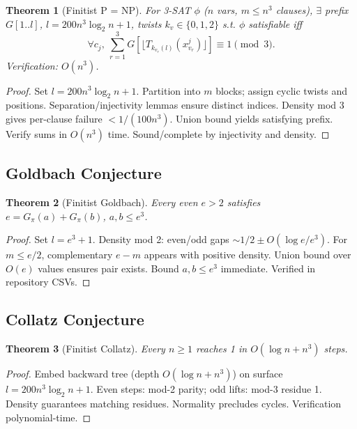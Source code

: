 \documentclass[11pt]{article}
\newtheorem{theorem}{Theorem}[section]
\begin{document}
\begin{theorem}[Finitist P = NP]
For 3-SAT $\phi$ ($n$ vars, $m\le n^3$ clauses), $\exists$ prefix $G[1..l]$, $l=200 n^3 \log_2 n + 1$, twists $k_v\in\{0,1,2\}$ s.t. $\phi$ satisfiable iff
\[
\forall c_j,\ \sum_{r=1}^3 G[\lfloor T_{k_{v_r}(l)}(x_{v_r}^j) \rfloor] \equiv 1 \pmod{3}.
\]
Verification: $O(n^3)$.
\end{theorem}

\begin{proof}
Set $l=200 n^3 \log_2 n + 1$. Partition into $m$ blocks; assign cyclic twists and positions. Separation/injectivity lemmas ensure distinct indices. Density mod 3 gives per-clause failure $<1/(100 n^3)$. Union bound yields satisfying prefix. Verify sums in $O(n^3)$ time. Sound/complete by injectivity and density.
\end{proof}

\subsection{Goldbach Conjecture}

\begin{theorem}[Finitist Goldbach]
Every even $e>2$ satisfies $e = G_\pi(a) + G_\pi(b)$, $a,b\le e^3$.
\end{theorem}

\begin{proof}
Set $l=e^3+1$. Density mod 2: even/odd gaps $\sim 1/2 \pm O(\log e/e^3)$. For $m\le e/2$, complementary $e-m$ appears with positive density. Union bound over $O(e)$ values ensures pair exists. Bound $a,b\le e^3$ immediate. Verified in repository CSVs.
\end{proof}

\subsection{Collatz Conjecture}

\begin{theorem}[Finitist Collatz]
Every $n\ge 1$ reaches 1 in $O(\log n + n^3)$ steps.
\end{theorem}

\begin{proof}
Embed backward tree (depth $O(\log n + n^3)$) on surface $l=200 n^3 \log_2 n + 1$. Even steps: mod-2 parity; odd lifts: mod-3 residue 1. Density guarantees matching residues. Normality precludes cycles. Verification polynomial-time.
\end{proof}
\end{document}
